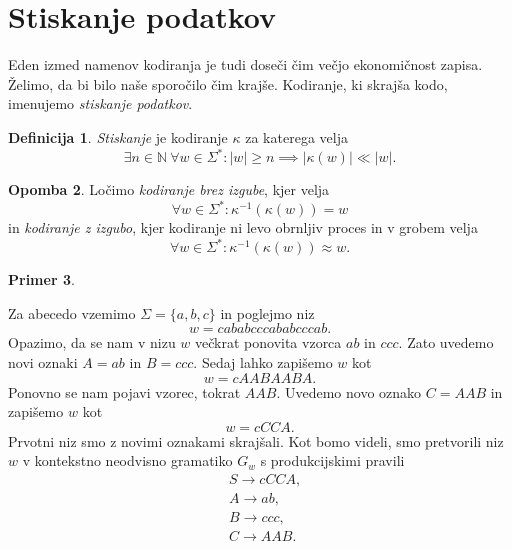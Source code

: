 \documentclass{amsart}
\newcommand{\N}{\mathbb{N}}
\theoremstyle{definition}
\newtheorem{definicija}{Definicija}[section]
\newtheorem{primer}[definicija]{Primer}
\newtheorem{opomba}[definicija]{Opomba}
\theoremstyle{plain} %
\begin{document}
\section{Stiskanje podatkov}

Eden izmed namenov kodiranja je tudi doseči čim večjo ekonomičnost zapisa. Želimo, da bi bilo naše sporočilo
čim krajše. Kodiranje, ki skrajša kodo, imenujemo \textit{stiskanje podatkov}.

\begin{definicija}
    
    \textit{Stiskanje} je kodiranje $ \kappa $ za katerega velja 
    \[ 
    \exists n \in \N \ \forall w \in \Sigma^* \colon |w| \geq n \implies
    \left\lvert \kappa(w)\right\rvert \ll \left\lvert w \right\rvert.
    \]

\end{definicija}

\begin{opomba}
    
    Ločimo \textit{kodiranje brez izgube}, kjer velja
    \[
        \forall w \in \Sigma^* \colon \kappa^{-1}(\kappa(w)) = w
    \]
    in \textit{kodiranje z izgubo}, kjer kodiranje ni levo obrnljiv proces
    in v grobem velja
    \[
        \forall w \in \Sigma^* \colon \kappa^{-1}(\kappa(w)) \approx w.
    \]

\end{opomba}

\begin{primer}\label{Stiskanje}
    
    Za abecedo vzemimo $ \Sigma = \{ a,b,c \} $ in poglejmo niz
    \[
        w = \mathit{cababcccababcccab}.
    \]
    Opazimo, da se nam v nizu $ w $ večkrat ponovita vzorca $ \mathit{ab} $ in $ \mathit{ccc} $.
    Zato uvedemo novi oznaki $ A = \mathit{ab} $ in $ B = \mathit{ccc} $. Sedaj lahko zapišemo
    $ w $ kot
    \[
        w = \mathit{cAABAABA}.
    \]
    Ponovno se nam pojavi vzorec, tokrat $ \mathit{AAB} $. Uvedemo novo oznako $ C = \mathit{AAB} $
    in zapišemo $ w $ kot
    \[
        w = \mathit{cCCA}.
    \]
    Prvotni niz smo z novimi oznakami skrajšali. Kot bomo videli, smo
    pretvorili niz $ w $ v kontekstno neodvisno gramatiko $ G_w $ s
    produkcijskimi pravili
    \begin{align*}
        & S  \rightarrow  \mathit{cCCA}, \\
        & A  \rightarrow  \mathit{ab}, \\
        & B  \rightarrow  \mathit{ccc}, \\
        & C  \rightarrow  \mathit{AAB}.
    \end{align*}

\end{primer}
\end{document}
